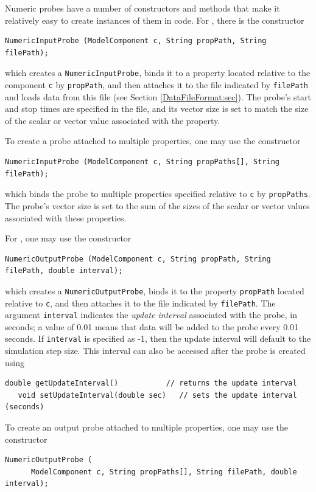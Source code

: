 Numeric probes have a number of constructors and methods that make it
relatively easy to create instances of them in code. For 
, there
is the constructor
\begin{lstlisting}[]
   NumericInputProbe (ModelComponent c, String propPath, String filePath);
\end{lstlisting}
%
which creates a {\tt NumericInputProbe}, binds it to a property
located relative to the component {\tt c} by {\tt propPath}, and then
attaches it to the file indicated by {\tt filePath} and loads data
from this file (see Section \ref{DataFileFormat:sec}). The probe's start and
stop times are specified in the file, and its vector size is
set to match the size of the scalar or vector value associated with
the property.

To create a probe attached to multiple properties, one may use the
constructor
\begin{lstlisting}[]
   NumericInputProbe (ModelComponent c, String propPaths[], String filePath);
\end{lstlisting}
%
which binds the probe to multiple properties specified relative to
{\tt c} by {\tt propPaths}. The probe's vector size is set to
the sum of the sizes of the scalar or vector values associated with
these properties.

For , one may use
the constructor
\begin{lstlisting}[]
   NumericOutputProbe (ModelComponent c, String propPath, String filePath, double interval);
\end{lstlisting}
%
which creates a {\tt NumericOutputProbe}, binds it to the property
{\tt propPath} located relative to {\tt c}, and then attaches it to
the file indicated by {\tt filePath}. The argument {\tt interval}
indicates the {\it update interval} associated with the probe, in seconds;
a value of 0.01 means that data will be added to the probe every 0.01
seconds.  If {\tt interval} is specified as -1, then the update interval
will default to the simulation step size. This interval can
also be accessed after the probe is created using
\begin{lstlisting}[]
   double getUpdateInterval()           // returns the update interval
   void setUpdateInterval(double sec)   // sets the update interval (seconds)
\end{lstlisting}
%
To create an output probe attached to multiple properties, one may use the
constructor
\begin{lstlisting}[]
   NumericOutputProbe (
      ModelComponent c, String propPaths[], String filePath, double interval);
\end{lstlisting}
%

